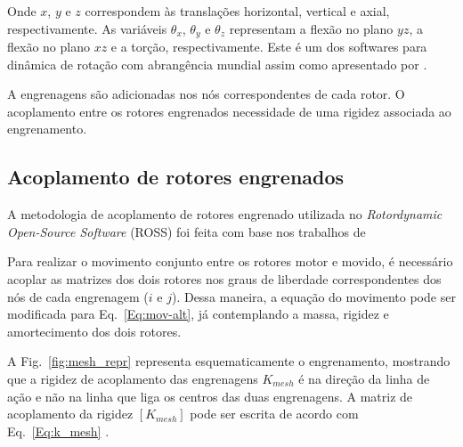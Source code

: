 \documentclass[10pt,fleqn,a4paper,twoside]{article}
\begin{document}
	Onde $x$, $y$ e $z$ correspondem às translações horizontal, vertical e axial, respectivamente. As variáveis $\theta_x$, $\theta_y$ e $\theta_z$ representam a flexão no plano $yz$, a flexão no plano $xz$ e a torção, respectivamente. Este é um dos softwares para  dinâmica de rotação com abrangência mundial assim como apresentado por \citet{jessica2025}.
	
	A engrenagens são adicionadas nos nós correspondentes de cada rotor. O acoplamento entre os rotores engrenados necessidade de uma rigidez associada ao engrenamento.
	
	\subsection{Acoplamento de rotores engrenados}
	
	A metodologia de acoplamento de rotores engrenado utilizada no \textit{Rotordynamic Open-Source Software} (ROSS) foi feita com base nos trabalhos de \citet{stringer2008, kaplan_paper_2013, kaplan2015}
	
	Para realizar o movimento conjunto entre os rotores motor e movido, é necessário acoplar as matrizes dos dois rotores nos graus de liberdade correspondentes dos nós de cada engrenagem ($i$ e $j$). Dessa maneira, a equação do movimento pode ser modificada para Eq.~\ref{Eq:mov-alt}, já contemplando a massa, rigidez e amortecimento dos dois rotores.
	
	A Fig.~\ref{fig:mesh_repr} representa esquematicamente o engrenamento, mostrando que a rigidez de acoplamento das engrenagens $K_{mesh}$ é na direção da linha de ação e não na linha que liga os centros das duas engrenagens. A matriz de acoplamento da rigidez $[K_{mesh}]$ pode ser escrita de acordo com Eq.~\ref{Eq:k_mesh} \citep{stringer2008}.
	
\end{document}
